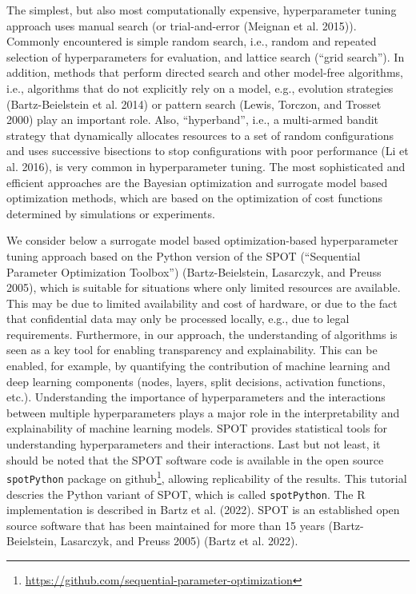 \documentclass[
  letterpaper,
  DIV=11,
  numbers=noendperiod]{scrreprt}
\begin{document}
The simplest, but also most computationally expensive, hyperparameter
tuning approach uses manual search (or trial-and-error (Meignan et al.
2015)). Commonly encountered is simple random search, i.e., random and
repeated selection of hyperparameters for evaluation, and lattice search
(``grid search''). In addition, methods that perform directed search and
other model-free algorithms, i.e., algorithms that do not explicitly
rely on a model, e.g., evolution strategies (Bartz-Beielstein et al.
2014) or pattern search (Lewis, Torczon, and Trosset 2000) play an
important role. Also, ``hyperband'', i.e., a multi-armed bandit strategy
that dynamically allocates resources to a set of random configurations
and uses successive bisections to stop configurations with poor
performance (Li et al. 2016), is very common in hyperparameter tuning.
The most sophisticated and efficient approaches are the Bayesian
optimization and surrogate model based optimization methods, which are
based on the optimization of cost functions determined by simulations or
experiments.

We consider below a surrogate model based optimization-based
hyperparameter tuning approach based on the Python version of the SPOT
(``Sequential Parameter Optimization Toolbox'') (Bartz-Beielstein,
Lasarczyk, and Preuss 2005), which is suitable for situations where only
limited resources are available. This may be due to limited availability
and cost of hardware, or due to the fact that confidential data may only
be processed locally, e.g., due to legal requirements. Furthermore, in
our approach, the understanding of algorithms is seen as a key tool for
enabling transparency and explainability. This can be enabled, for
example, by quantifying the contribution of machine learning and deep
learning components (nodes, layers, split decisions, activation
functions, etc.). Understanding the importance of hyperparameters and
the interactions between multiple hyperparameters plays a major role in
the interpretability and explainability of machine learning models. SPOT
provides statistical tools for understanding hyperparameters and their
interactions. Last but not least, it should be noted that the SPOT
software code is available in the open source \texttt{spotPython}
package on github\footnote{\url{https://github.com/sequential-parameter-optimization}},
allowing replicability of the results. This tutorial descries the Python
variant of SPOT, which is called \texttt{spotPython}. The R
implementation is described in Bartz et al. (2022). SPOT is an
established open source software that has been maintained for more than
15 years (Bartz-Beielstein, Lasarczyk, and Preuss 2005) (Bartz et al.
2022).
\end{document}
